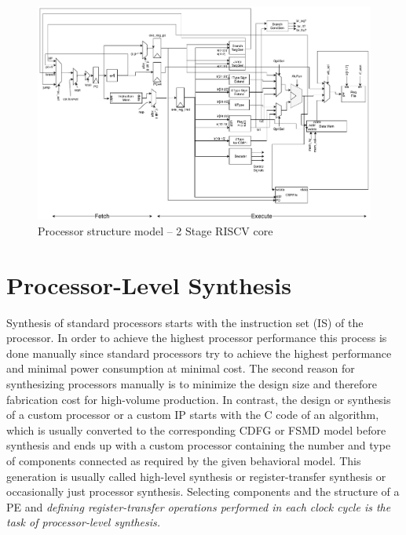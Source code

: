 \begin{figure}[!t]
    \centering
    \includegraphics[width=\textwidth]{figures/Introduction/2stage.pdf}
    \caption{Processor structure model -- 2 Stage RISCV core}
    \label{fig:proc_structure}
\end{figure}


\section{Processor-Level Synthesis}

Synthesis of standard processors starts with the instruction set (IS) of the processor.
In order to achieve the highest processor performance this process is done manually since standard processors try to achieve the highest performance and minimal power consumption at minimal cost.
The second reason for synthesizing processors manually is to minimize the design size and therefore fabrication cost for high-volume production.
In contrast, the design or synthesis of a custom processor or a custom IP starts with the C code of an algorithm, which is usually converted to the corresponding CDFG or FSMD model before synthesis and ends up with a custom processor containing the number and type of components connected as required by the given behavioral model.
This generation is usually called high-level synthesis or register-transfer synthesis or occasionally just processor synthesis.
Selecting components and the structure of a PE and \emph{defining register-transfer operations performed in each clock cycle is the task of processor-level synthesis.}

